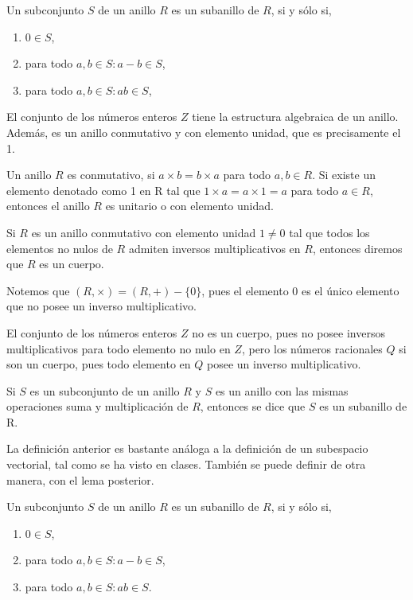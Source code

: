\begin{lema}
Un subconjunto $S$ de un anillo $R$ es un subanillo de $R$, si y sólo si,
\begin{enumerate}
    \item $0\in S$,
    \item para todo $a,b\in S:a-b\in S$,
    \item para todo $a,b\in S:ab\in S$,
\end{enumerate}
\end{lema}
\begin{ejemplo}
El conjunto de los números enteros $Z$ tiene la estructura algebraica de un anillo. Además, es un anillo conmutativo y con elemento unidad, que es precisamente el 1.
\end{ejemplo}
Un anillo $R$ es conmutativo, si $a\times b = b\times a$ para todo $a,b\in R$. Si existe un elemento denotado como 1 en R tal que $1\times a=a\times 1 = a$ para todo $a\in R$, entonces el anillo $R$ es unitario o con elemento unidad.
\begin{defi}
Si $R$ es un anillo conmutativo con elemento unidad $1\neq 0$ tal que todos los elementos no nulos de $R$ admiten inversos multiplicativos en $R$, entonces diremos que $R$ es un cuerpo.
\end{defi}
Notemos que $(R,\times)=(R,+)-\lbrace 0 \rbrace$, pues el elemento 0 es el único elemento que no posee un inverso multiplicativo.
\begin{ejemplo}
El conjunto de los números enteros $Z$ no es un cuerpo, pues no posee inversos multiplicativos para todo elemento no nulo en $Z$, pero los números racionales $Q$ si son un cuerpo, pues todo elemento en $Q$ posee un inverso multiplicativo.
\end{ejemplo}
\begin{defi}
Si $S$ es un subconjunto de un anillo $R$ y $S$ es un anillo con las mismas operaciones suma y multiplicación de $R$, entonces se dice que $S$ es un subanillo de R.
\end{defi}
La definición anterior es bastante análoga a la definición de un subespacio vectorial, tal como se ha visto en clases. También se puede definir de otra manera, con el lema posterior.
\begin{defi}
Un subconjunto $S$ de un anillo $R$ es un subanillo de $R$, si y sólo si,
\begin{enumerate}
    \item $0\in S$,
    \item para todo $a,b\in S: a-b\in S$,
    \item para todo $a,b\in S: ab\in S$.
\end{enumerate}
\end{defi}
